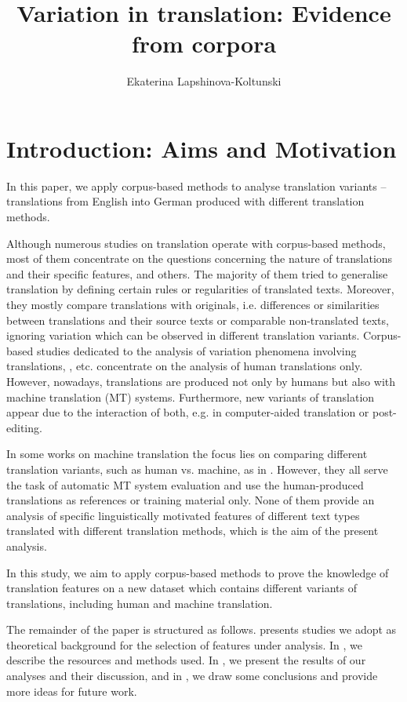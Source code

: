 \documentclass[output=paper]{LSP/langsci}
\author{Ekaterina Lapshinova-Koltunski}
\title{Variation in translation: Evidence from corpora}
\begin{document}
\section{Introduction: Aims and Motivation} \label{sec:4:1}

In this paper, we apply corpus-based methods to analyse translation variants – translations from English into German produced with different translation methods.

Although numerous studies on translation operate with corpus-based methods, most of them concentrate on the questions concerning the nature of translations and their specific features, \citep[see e.g.][]{Baker1993,Baker1995,Laviosa2002,Chesterman2004} and others. The majority of them tried to generalise translation by deﬁning certain rules or regularities of translated texts.  Moreover, they mostly compare translations with originals, i.e. differences or similarities between translations and their source texts or comparable non-translated texts, ignoring variation which can be observed in different translation variants. Corpus-based studies dedicated to the analysis of variation phenomena involving translations, \citep[e.g.][]{Teich2003,Steiner2004,Neumann2013}, etc. concentrate on the analysis of human translations only. However, nowadays, translations are produced not only by humans but also with machine translation (MT) systems. Furthermore, new variants of translation appear due to the interaction of both, e.g. in computer-aided translation or post-editing.

In some works on machine translation the focus lies on comparing different translation variants, such as human vs. machine, as in  \citep{White1994,Papineni2002,BabychHartley2004,Popovic2011}. However, they all serve the task of automatic MT system evaluation and use the human-produced translations as references or training material only. None of them provide an analysis of specific linguistically motivated features of different text types translated with different translation methods, which is the aim of the present analysis.

In this study, we aim to apply corpus-based methods to prove the knowledge of translation features on a new dataset which contains different variants of translations, including human and machine translation.

The remainder of the paper is structured as follows.  presents studies we adopt as theoretical background for the selection of features under analysis. In , we describe the resources and methods used. In , we present the results of our analyses and their discussion, and in , we draw some conclusions and provide more ideas for future work.
\end{document}
